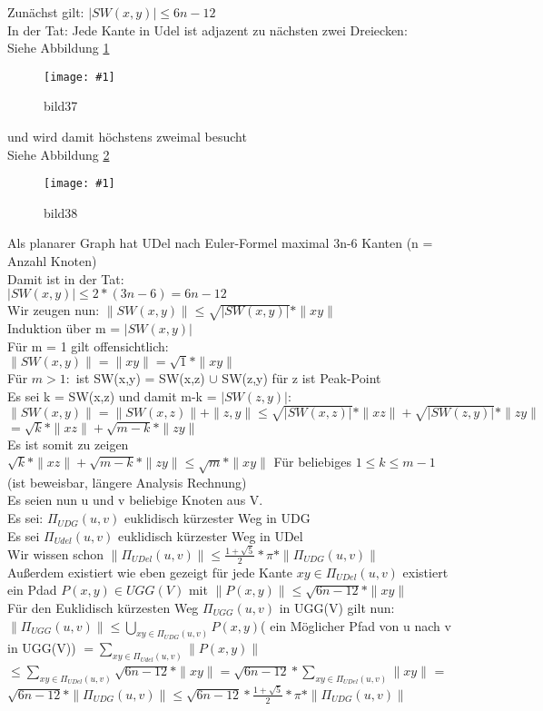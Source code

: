 \documentclass{article}
\newcommand{\bild}[4]{ %
	\begin{figure}[h!]
		\centering
		\texttt{[image: \#1]}
		\caption{#3}
		\label{#4}
	\end{figure}	
}
\newcommand{\sieheBild}[4]{
	Siehe Abbildung \ref{#4}
	\bild{#1}{#2}{#3}{#4}
}
\newcommand{\doubleAbs}[1]{
	\|#1\|
}
\begin{document}
Zunächst gilt: $|SW(x,y)| \leq 6n-12$
\\
In der Tat: Jede Kante in Udel ist adjazent zu nächsten zwei Dreiecken:\\
\sieheBild{Bilder/37.png}{0.4}{bild37}{Bild 37}
und wird damit höchstens zweimal besucht\\
\sieheBild{Bilder/38.png}{0.4}{bild38}{Bild 38}
Als planarer Graph hat UDel nach Euler-Formel maximal 3n-6 Kanten (n = Anzahl Knoten)\\
Damit ist in der Tat: \\
$|SW(x,y)| \leq 2 * (3n-6) = 6n-12$\\
Wir zeugen nun: $\doubleAbs{SW(x,y)} \leq \sqrt{|SW(x,y)|} * \doubleAbs{xy}$\\
Induktion über m = $|SW(x,y)|$\\
Für m = 1 gilt offensichtlich: \\
$\doubleAbs{SW(x,y)} = \doubleAbs{xy} = \sqrt{1} * \doubleAbs{xy}$\\
Für $m > 1:$ ist SW(x,y) = SW(x,z) $\cup$ SW(z,y) für z ist Peak-Point\\
Es sei k = SW(x,z) und damit m-k = $|SW(z,y)|$:\\
$\doubleAbs{SW(x,y)} = \doubleAbs{SW(x,z)} + \doubleAbs{z,y} \leq \sqrt{|SW(x,z)|} * \doubleAbs{xz} + \sqrt{|SW(z,y)|} * \doubleAbs{zy}$\\
$= \sqrt{k} * \doubleAbs{xz} + \sqrt{m-k} * \doubleAbs{zy}$\\
Es ist somit zu zeigen\\
$\sqrt{k} * \doubleAbs{xz} + \sqrt{m-k} * \doubleAbs{zy} \leq \sqrt{m} * \doubleAbs{xy}$ Für beliebiges $1 \leq k \leq m-1$\\
(ist beweisbar, längere Analysis Rechnung)\\
Es seien nun u und v beliebige Knoten aus V.\\
Es sei: $\Pi_{UDG}(u,v)$ euklidisch kürzester Weg in UDG\\
Es sei $\Pi_{Udel}(u,v)$ euklidisch kürzester Weg in UDel\\
Wir wissen schon $\doubleAbs{\Pi_{UDel}(u,v)} \leq \frac{1+\sqrt{5}}{2} * \pi * \doubleAbs{\Pi_{UDG}(u,v)}$\\
Außerdem existiert wie eben gezeigt für jede Kante $xy \in \Pi_{UDel}(u,v)$ existiert ein Pdad $P(x,y) \in UGG(V)$ mit $\doubleAbs{P(x,y)} \leq \sqrt{6n-12} * \doubleAbs{xy}$\\
Für den Euklidisch kürzesten Weg $\Pi_{UGG}(u,v)$ in UGG(V) gilt nun:\\
$\doubleAbs{\Pi_{UGG}(u,v)} \leq \bigcup\limits_{xy \in \Pi_{UDG}(u,v)} P(x,y)$( ein Möglicher Pfad von u nach v in UGG(V)) $= \sum\limits_{xy \in \Pi_{Udel}(u,v)} \doubleAbs{P(x,y)}$\\
$\leq \sum\limits_{xy \in \Pi_{UDel}(u,v)} \sqrt{6n-12} * \doubleAbs{xy} = \sqrt{6n-12} * \sum\limits_{xy \in \Pi_{UDel}(u,v)} \doubleAbs{xy}$ = $\sqrt{6n-12} * \doubleAbs{\Pi_{UDG}(u,v)} \leq \sqrt{6n-12} * \frac{1+\sqrt{5}}{2} * \pi * \doubleAbs{\Pi_{UDG}(u,v)}$
\end{document}
